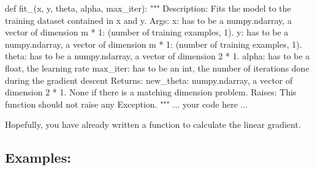 \documentclass[]{article}
\newenvironment{Shaded}{\begin{snugshade}}{\end{snugshade}}
\newcommand{\CommentTok}[1]{\textcolor[rgb]{0.48,0.49,0.49}{#1}}
\newcommand{\KeywordTok}[1]{\textcolor[rgb]{0.81,0.81,0.76}{#1}}
\newcommand{\NormalTok}[1]{\textcolor[rgb]{0.81,0.81,0.76}{#1}}
\begin{document}
\begin{Shaded}
\begin{Highlighting}[]
\KeywordTok{def}\NormalTok{ fit_(x, y, theta, alpha, max_iter):}
    \CommentTok{"""}
\CommentTok{    Description:}
\CommentTok{        Fits the model to the training dataset contained in x and y.}
\CommentTok{    Args:}
\CommentTok{        x: has to be a numpy.ndarray, a vector of dimension m * 1: (number of training examples, 1).}
\CommentTok{        y: has to be a numpy.ndarray, a vector of dimension m * 1: (number of training examples, 1).}
\CommentTok{        theta: has to be a numpy.ndarray, a vector of dimension 2 * 1.}
\CommentTok{        alpha: has to be a float, the learning rate}
\CommentTok{        max_iter: has to be an int, the number of iterations done during the gradient descent}
\CommentTok{    Returns:}
\CommentTok{        new_theta: numpy.ndarray, a vector of dimension 2 * 1.}
\CommentTok{        None if there is a matching dimension problem.}
\CommentTok{    Raises:}
\CommentTok{        This function should not raise any Exception.}
\CommentTok{    """}
\NormalTok{        ... your code here ...}
\end{Highlighting}
\end{Shaded}

Hopefully, you have already written a function to calculate the linear
gradient.

\hypertarget{examples-4}{%
\subsection{Examples:}\label{examples-4}}
\end{document}
